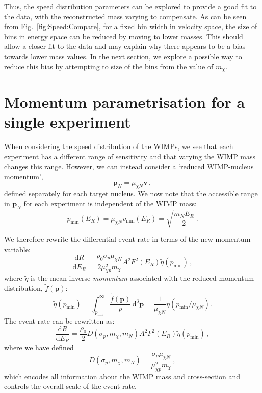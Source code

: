 Thus, the speed distribution parameters can be explored to provide a good fit to the data, with the reconstructed mass varying to compensate. As can be seen from Fig.\ \ref{fig:Speed:Compare}, for a fixed bin width in velocity space, the size of bins in energy space can be reduced by moving to lower masses. This should allow a closer fit to the data and may explain why there appears to be a bias towards lower mass values. In the next section, we explore a possible way to reduce this bias by attempting to size of the bins from the value of $m_\chi$.


\section{Momentum parametrisation for a single experiment}
\label{sec:Speed:MomentumMethod1}


When considering the speed distribution of the WIMPs, we see that each experiment has a different range of sensitivity and that varying the WIMP mass changes this range. However, we can instead consider a `reduced WIMP-nucleus momentum',
\begin{equation}
\textbf{p}_N = \mu_{\chi N} \textbf{v} \,,
\end{equation}
defined separately for each target nucleus. We now note that the accessible range in \(\textbf{p}_N\) for each experiment is independent of the WIMP mass:
\begin{equation}
p_\textrm{min}(E_R) = \mu_{\chi N} v_\textrm{min}(E_R) = \sqrt{\frac{m_N E_R}{2}} \,.
\end{equation}

We therefore rewrite the differential event rate in terms of the new momentum variable:
\begin{equation}
\frac{\textrm{d}R}{\textrm{d}E_R} = \frac{\rho_0 \sigma_p \mu_{\chi N}}{2 \mu_{\chi p}^2 m_\chi} A^2 F^2(E_R) \tilde{\eta}(p_{\textrm{min}})\,,
\end{equation}
where \(\tilde{\eta}\) is the mean inverse \textit{momentum} associated with the reduced momentum distribution, \(\tilde{f}(\textbf{p})\):
\begin{equation}
\tilde{\eta}(p_{\textrm{min}}) = \int_{p_{\textrm{min}}}^\infty \frac{\tilde{f}(\textbf{p})}{p}\, \textrm{d}^3\textbf{p} = \frac{1}{\mu_{\chi N}}\eta(p_\textrm{min}/\mu_{\chi N}).
\end{equation}
The event rate can be rewritten as:
\begin{equation}
\frac{\textrm{d}R}{\textrm{d}E_R} = \frac{\rho_0}{2} D(\sigma_p,m_\chi,m_N) A^2 F^2(E_R) \tilde{\eta}(p_{\textrm{min}}) \,,
\end{equation}
where we have defined
\begin{equation}
D(\sigma_p,m_\chi,m_N) = \frac{\sigma_p \mu_{\chi N}}{\mu_{\chi p}^2 m_\chi} \,,
\end{equation}
which encodes all information about the WIMP mass and cross-section and controls the overall scale of the event rate.

